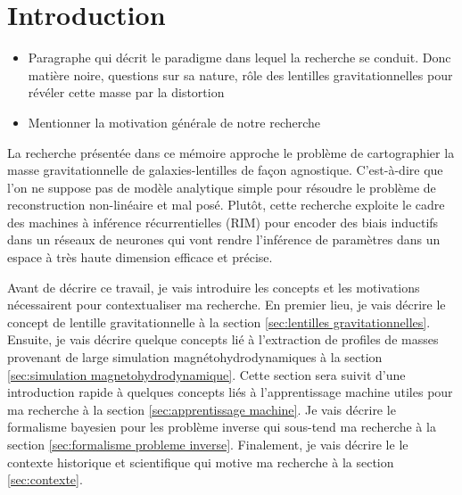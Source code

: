 \chapter{Introduction}
\thispagestyle{empty}

\begin{itemize}
        \item Paragraphe qui décrit le paradigme dans lequel la recherche se conduit. 
                Donc matière noire, questions sur sa nature, rôle des 
                lentilles gravitationnelles pour révéler cette masse par la distortion
        \item Mentionner la motivation générale de notre recherche
\end{itemize}

La recherche présentée dans ce mémoire approche le problème de cartographier la 
masse gravitationnelle de galaxies-lentilles de façon agnostique. C'est-à-dire que 
l'on ne suppose pas de modèle analytique simple pour résoudre le problème 
de reconstruction non-linéaire et mal posé. Plutôt, cette recherche exploite 
le cadre des machines à inférence récurrentielles (RIM) pour encoder des biais 
inductifs dans un réseaux de neurones qui vont rendre l'inférence de 
paramètres dans un espace à très haute dimension efficace et précise.

Avant de décrire ce travail, je vais introduire les concepts 
et les motivations nécessairent pour contextualiser ma recherche.
En premier lieu, je vais décrire le concept de lentille 
gravitationnelle à la section \ref{sec:lentilles gravitationnelles}. Ensuite, 
je vais décrire quelque concepts lié à l'extraction de profiles de masses 
provenant de large simulation magnétohydrodynamiques à la section 
\ref{sec:simulation magnetohydrodynamique}. 
Cette section sera suivit d'une introduction rapide à quelques concepts liés 
à l'apprentissage machine utiles pour ma recherche
à la section \ref{sec:apprentissage machine}. 
Je vais décrire le formalisme bayesien pour les problème inverse 
qui sous-tend ma recherche à la section \ref{sec:formalisme probleme inverse}.
Finalement, je vais décrire le 
le contexte historique et scientifique qui motive ma recherche 
à la section \ref{sec:contexte}.
\citep{Morningstar2019}

